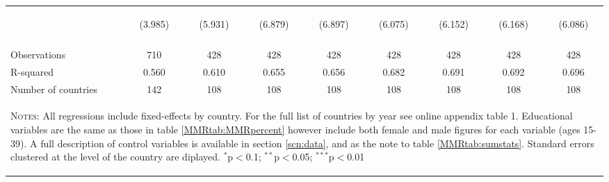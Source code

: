 \begin{landscape}
\begin{table}[htpb!]
\begin{center}
\begin{tabular}{lcccccccc}
&\begin{footnotesize}(3.985)\end{footnotesize}&\begin{footnotesize}(5.931)\end{footnotesize}&\begin{footnotesize}(6.879)\end{footnotesize}&\begin{footnotesize}(6.897)\end{footnotesize}&\begin{footnotesize}(6.075)\end{footnotesize}&\begin{footnotesize}(6.152)\end{footnotesize}&\begin{footnotesize}(6.168)\end{footnotesize}&\begin{footnotesize}(6.086)\end{footnotesize}\\
&&&&&&&&\\Observations&710&428&428&428&428&428&428&428\\
R-squared&0.560&0.610&0.655&0.656&0.682&0.691&0.692&0.696\\
Number of countries&142&108&108&108&108&108&108&108\\
\midrule
\multicolumn{9}{p{20cm}}{\begin{footnotesize}\textsc{Notes:} All regressions include fixed-effects by country. For the full list of countries by year see online appendix table 1. Educational variables are the same as those in table \ref{MMRtab:MMRpercent} however include both female and male figures for each variable (ages 15-39). A full description of control variables is available in section \ref{scn:data}, and as the note to table \ref{MMRtab:sumstats}.  Standard errors clustered at the level of the country are diplayed.
$^{*}$p$<$0.1; $^{**}$p$<$0.05; $^{***}$p$<$0.01\end{footnotesize}} \\ \bottomrule 
\end{tabular}\end{center}\end{table}\end{landscape}
